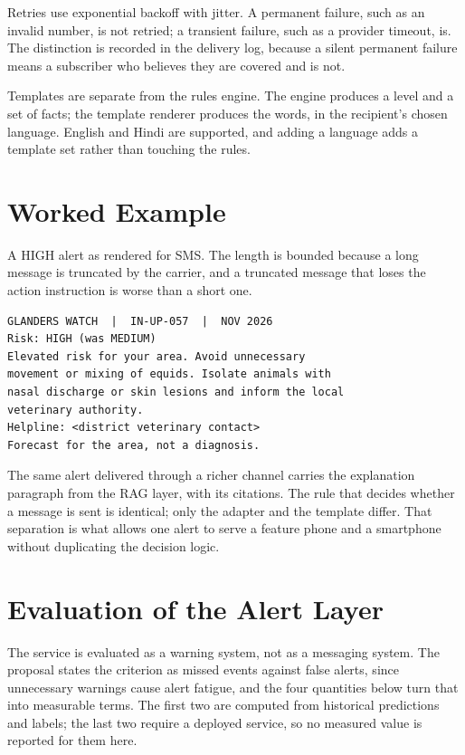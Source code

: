 \documentclass[10pt,openany]{report}
\begin{document}
Retries use exponential backoff with jitter. A permanent failure, such as an invalid number, is not
retried; a transient failure, such as a provider timeout, is. The distinction is recorded in the
delivery log, because a silent permanent failure means a subscriber who believes they are covered
and is not.

Templates are separate from the rules engine. The engine produces a level and a set of facts; the
template renderer produces the words, in the recipient's chosen language. English and Hindi are
supported, and adding a language adds a template set rather than touching the rules.

\section{Worked Example}

A HIGH alert as rendered for SMS. The length is bounded because a long message is truncated by the
carrier, and a truncated message that loses the action instruction is worse than a short one.

\begin{verbatim}
GLANDERS WATCH  |  IN-UP-057  |  NOV 2026
Risk: HIGH (was MEDIUM)
Elevated risk for your area. Avoid unnecessary
movement or mixing of equids. Isolate animals with
nasal discharge or skin lesions and inform the local
veterinary authority.
Helpline: <district veterinary contact>
Forecast for the area, not a diagnosis.
\end{verbatim}

The same alert delivered through a richer channel carries the explanation paragraph from the RAG
layer, with its citations. The rule that decides whether a message is sent is identical; only the
adapter and the template differ. That separation is what allows one alert to serve a feature phone
and a smartphone without duplicating the decision logic.

\section{Evaluation of the Alert Layer}

The service is evaluated as a warning system, not as a messaging system. The proposal states the
criterion as missed events against false alerts, since unnecessary warnings cause alert fatigue, and
the four quantities below turn that into measurable terms. The first two are computed from historical
predictions and labels; the last two require a deployed service, so no measured value is reported for
them here.
\end{document}
